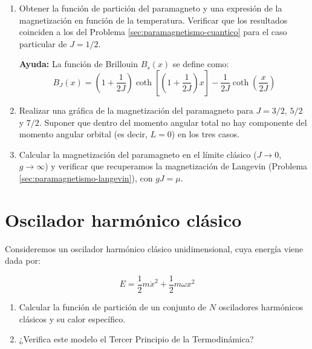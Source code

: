 \documentclass[a4paper,11pt]{article}
\begin{document}
\begin{enumerate}[label=(\alph*),
                  leftmargin=2\parindent,
                  rightmargin=2\parindent]

    \item{Obtener la función de partición del paramagneto y una 
          expresión de la magnetización en función de la temperatura. 
          Verificar que los resultados coinciden a los del Problema 
          \ref{sec:paramagnetismo-cuantico} para el caso particular de 
          $J=1/2$.}
    
    {\small
    \textbf{Ayuda:} La función de Brillouin $B_s(x)$ se define como:
    $$ B_J(x)  = \left( 1 + \frac{1}{2J} \right)
    \coth \left[ \left( 1 + \frac{1}{2J} \right)x \right] -
    \frac{1}{2J} \coth \left( \frac{x}{2J} \right) $$
    }

    \item{Realizar una gráfica de la magnetización del paramagneto 
          para $J = 3/2$, $5/2$ y $7/2$. Suponer que dentro del momento 
          angular total no hay componente del momento angular orbital 
          (es decir, $L=0$) en los tres casos.}

    \item{Calcular la magnetización del paramagneto en el límite 
          clásico ($J \rightarrow 0$, $g \rightarrow \infty$) y 
          verificar que recuperamos la magnetización de Langevin 
          (Problema \ref{sec:paramagnetismo-langevin}), con $gJ = \mu$.
          }


\end{enumerate}



\section{Oscilador harmónico clásico}

Consideremos un oscilador harmónico clásico unidimensional, cuya 
energía viene dada por:

$$ E = \frac{1}{2} m \dot{x}^2 + \frac{1}{2} m \omega x^2 $$


\begin{enumerate}[label=(\alph*),
                  leftmargin=2\parindent,
                  rightmargin=2\parindent]
                  
    \item{Calcular la función de partición de un conjunto de $N$ 
          osciladores harmónicos clásicos y su calor específico.}

    \item{¿Verifica este modelo el Tercer Principio de la 
          Termodinámica?}

\end{enumerate}
\end{document}
